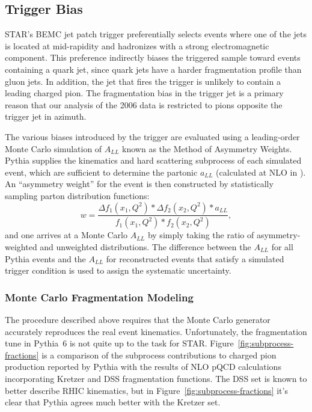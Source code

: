 \subsection{Trigger Bias}

STAR's BEMC jet patch trigger preferentially selects events where one of the
jets is located at mid-rapidity and hadronizes with a strong electromagnetic
component. This preference indirectly biases the triggered sample toward events
containing a quark jet, since quark jets have a harder fragmentation profile
than gluon jets. In addition, the jet that fires the trigger is unlikely to
contain a leading charged pion. The fragmentation bias in the trigger jet is a
primary reason that our analysis of the 2006 data is restricted to pions
opposite the trigger jet in azimuth.

The various biases introduced by the trigger are evaluated using a leading-order
Monte Carlo simulation of \(A_{LL}\) known as the Method of Asymmetry Weights.
Pythia supplies the kinematics and hard scattering subprocess of each simulated
event, which are sufficient to determine the partonic \(a_{LL}\) (calculated at
NLO in \cite{}). An ``asymmetry weight'' for the event is then constructed by
statistically sampling parton distribution functions:
%
\begin{equation}
  w = \frac{\Delta f_1(x_1, Q^2) * \Delta f_2(x_2, Q^2) * a_{LL}}{f_1(x_1, Q^2) * f_2(x_2, Q^2)},
\end{equation}
%
and one arrives at a Monte Carlo \(A_{LL}\) by simply taking the ratio of
asymmetry-weighted and unweighted distributions. The difference between the
\(A_{LL}\) for all Pythia events and the \(A_{LL}\) for reconstructed events
that satisfy a simulated trigger condition is used to assign the systematic
uncertainty.

\subsubsection{Monte Carlo Fragmentation Modeling}

The procedure described above requires that the Monte Carlo generator accurately
reproduces the real event kinematics. Unfortunately, the fragmentation tune in
Pythia~6 is not quite up to the task for STAR.
Figure~\ref{fig:subprocess-fractions} is a comparison of the subprocess
contributions to charged pion production reported by Pythia with the results of
NLO pQCD calculations incorporating Kretzer and DSS fragmentation functions. The
DSS set is known to better describe RHIC kinematics, but in
Figure~\ref{fig:subprocess-fractions} it's clear that Pythia agrees much better
with the Kretzer set.

